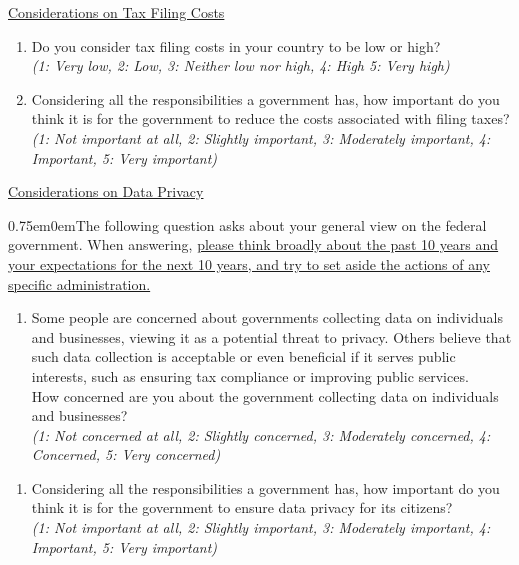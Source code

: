 \documentclass[11pt]{article}
\begin{document}
\underline{Considerations on Tax Filing Costs} \\ 
\begin{enumerate}[resume]
    \item Do you consider tax filing costs in your country to be low or high?\\ 
    \textit{(1: Very low, 2: Low, 3: Neither low nor high, 4: High 5: Very high)}
    \item Considering all the responsibilities a government has, how important do you think it is for the government to reduce the costs associated with filing taxes? \\ \textit{(1: Not important at all, 2: Slightly important, 3: Moderately important, 4: Important, 5: Very important)}
\end{enumerate}
\underline{Considerations on Data Privacy} \\ 
\begin{adjustwidth}{0.75em}{0em}The following question asks about your general view on the federal government. When answering, \uline{please think broadly about the past 10 years and your expectations for the next 10 years, and try to set aside the actions of any specific administration.}\end{adjustwidth}

\begin{enumerate}[resume]
    \item Some people are concerned about governments collecting data on individuals and businesses, viewing it as a potential threat to privacy. Others believe that such data collection is acceptable or even beneficial if it serves public interests, such as ensuring tax compliance or improving public services. \\ How concerned are you about the government collecting data on individuals and businesses?\\
    \textit{(1: Not concerned at all, 2: Slightly concerned, 3: Moderately concerned, 4: Concerned, 5: Very concerned)}
\end{enumerate}
\begin{enumerate}[resume]
    \item Considering all the responsibilities a government has, how important do you think it is for the government to ensure data privacy for its citizens? \\
    \textit{(1: Not important at all, 2: Slightly important, 3: Moderately important, 4: Important, 5: Very important)}
\end{enumerate}    
\end{document}
